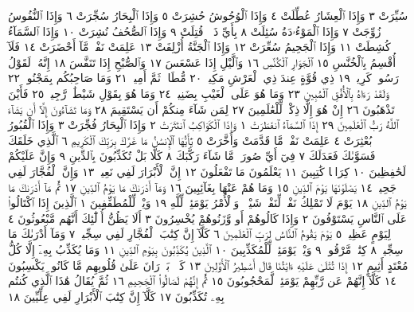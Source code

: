 سُيِّرَتْ ٣ وَإِذَا ٱلْعِشَارُ عُطِّلَتْ ٤ وَإِذَا ٱلْوُحُوشُ حُشِرَتْ ٥
وَإِذَا ٱلْبِحَارُ سُجِّرَتْ ٦ وَإِذَا ٱلنُّفُوسُ زُوِّجَتْ ٧ وَإِذَا ٱلْمَوْءُۥدَةُ
سُئِلَتْ ٨ بِأَيِّ ذَنۢبࣲ قُتِلَتْ ٩ وَإِذَا ٱلصُّحُفُ نُشِرَتْ ١٠
وَإِذَا ٱلسَّمَآءُ كُشِطَتْ ١١ وَإِذَا ٱلْجَحِيمُ سُعِّرَتْ ١٢ وَإِذَا ٱلْجَنَّةُ
أُزْلِفَتْ ١٣ عَلِمَتْ نَفْسࣱ مَّآ أَحْضَرَتْ ١٤ فَلَآ أُقْسِمُ بِٱلْخُنَّسِ ١٥
ٱلْجَوَارِ ٱلْكُنَّسِ ١٦ وَٱلَّيْلِ إِذَا عَسْعَسَ ١٧ وَٱلصُّبْحِ إِذَا تَنَفَّسَ ١٨
إِنَّهُۥ لَقَوْلُ رَسُولࣲ كَرِيمࣲ ١٩ ذِي قُوَّةٍ عِندَ ذِي ٱلْعَرْشِ مَكِينࣲ ٢٠ مُّطَاعࣲ ثَمَّ
أَمِينࣲ ٢١ وَمَا صَاحِبُكُم بِمَجْنُونࣲ ٢٢ وَلَقَدْ رَءَاهُ بِٱلْأُفُقِ ٱلْمُبِينِ ٢٣
وَمَا هُوَ عَلَى ٱلْغَيْبِ بِضَنِينࣲ ٢٤ وَمَا هُوَ بِقَوْلِ شَيْطَٰنࣲ رَّجِيمࣲ ٢٥
فَأَيْنَ تَذْهَبُونَ ٢٦ إِنْ هُوَ إِلَّا ذِكْرࣱ لِّلْعَٰلَمِينَ ٢٧ لِمَن شَآءَ مِنكُمْ أَن
يَسْتَقِيمَ ٢٨ وَمَا تَشَآءُونَ إِلَّآ أَن يَشَآءَ ٱللَّهُ رَبُّ ٱلْعَٰلَمِينَ ٢٩
إِذَا ٱلسَّمَآءُ ٱنفَطَرَتْ ١ وَإِذَا ٱلْكَوَاكِبُ ٱنتَثَرَتْ ٢ وَإِذَا ٱلْبِحَارُ
فُجِّرَتْ ٣ وَإِذَا ٱلْقُبُورُ بُعْثِرَتْ ٤ عَلِمَتْ نَفْسࣱ مَّا قَدَّمَتْ
وَأَخَّرَتْ ٥ يَٰٓأَيُّهَا ٱلْإِنسَٰنُ مَا غَرَّكَ بِرَبِّكَ ٱلْكَرِيمِ ٦ ٱلَّذِي
خَلَقَكَ فَسَوَّىٰكَ فَعَدَلَكَ ٧ فِيٓ أَيِّ صُورَةࣲ مَّا شَآءَ رَكَّبَكَ ٨
كَلَّا بَلْ تُكَذِّبُونَ بِٱلدِّينِ ٩ وَإِنَّ عَلَيْكُمْ لَحَٰفِظِينَ ١٠ كِرَامࣰا
كَٰتِبِينَ ١١ يَعْلَمُونَ مَا تَفْعَلُونَ ١٢ إِنَّ ٱلْأَبْرَارَ لَفِي نَعِيمࣲ ١٣ وَإِنَّ
ٱلْفُجَّارَ لَفِي جَحِيمࣲ ١٤ يَصْلَوْنَهَا يَوْمَ ٱلدِّينِ ١٥ وَمَا هُمْ عَنْهَا
بِغَآئِبِينَ ١٦ وَمَآ أَدْرَىٰكَ مَا يَوْمُ ٱلدِّينِ ١٧ ثُمَّ مَآ أَدْرَىٰكَ مَا يَوْمُ
ٱلدِّينِ ١٨ يَوْمَ لَا تَمْلِكُ نَفْسࣱ لِّنَفْسࣲ شَيْـࣰٔاۖ وَٱلْأَمْرُ يَوْمَئِذࣲ لِّلَّهِ ١٩
وَيْلࣱ لِّلْمُطَفِّفِينَ ١ ٱلَّذِينَ إِذَا ٱكْتَالُوا۟ عَلَى ٱلنَّاسِ يَسْتَوْفُونَ ٢
وَإِذَا كَالُوهُمْ أَو وَّزَنُوهُمْ يُخْسِرُونَ ٣ أَلَا يَظُنُّ أُو۟لَٰٓئِكَ أَنَّهُم مَّبْعُوثُونَ ٤
لِيَوْمٍ عَظِيمࣲ ٥ يَوْمَ يَقُومُ ٱلنَّاسُ لِرَبِّ ٱلْعَٰلَمِينَ ٦ كَلَّآ إِنَّ كِتَٰبَ
ٱلْفُجَّارِ لَفِي سِجِّينࣲ ٧ وَمَآ أَدْرَىٰكَ مَا سِجِّينࣱ ٨ كِتَٰبࣱ مَّرْقُومࣱ ٩
وَيْلࣱ يَوْمَئِذࣲ لِّلْمُكَذِّبِينَ ١٠ ٱلَّذِينَ يُكَذِّبُونَ بِيَوْمِ ٱلدِّينِ ١١ وَمَا يُكَذِّبُ
بِهِۦٓ إِلَّا كُلُّ مُعْتَدٍ أَثِيمٍ ١٢ إِذَا تُتْلَىٰ عَلَيْهِ ءَايَٰتُنَا قَالَ أَسَٰطِيرُ ٱلْأَوَّلِينَ ١٣
كَلَّاۖ بَلْ͏ۜ رَانَ عَلَىٰ قُلُوبِهِم مَّا كَانُوا۟ يَكْسِبُونَ ١٤ كَلَّآ إِنَّهُمْ عَن رَّبِّهِمْ
يَوْمَئِذࣲ لَّمَحْجُوبُونَ ١٥ ثُمَّ إِنَّهُمْ لَصَالُوا۟ ٱلْجَحِيمِ ١٦ ثُمَّ يُقَالُ هَٰذَا
ٱلَّذِي كُنتُم بِهِۦ تُكَذِّبُونَ ١٧ كَلَّآ إِنَّ كِتَٰبَ ٱلْأَبْرَارِ لَفِي عِلِّيِّينَ ١٨
